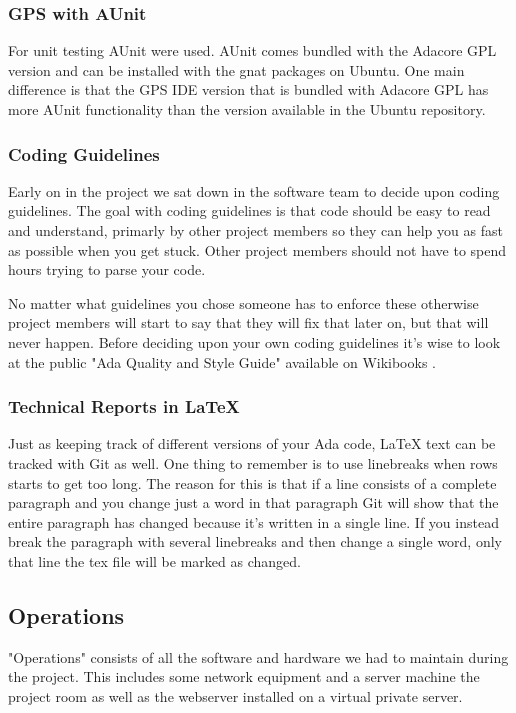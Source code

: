 \subsubsection{GPS with AUnit}
For unit testing AUnit were used. AUnit comes bundled with the Adacore GPL version
and can be installed with the gnat packages on Ubuntu. One main difference is that
the GPS IDE version that is bundled with Adacore GPL has more AUnit functionality
than the version available in the Ubuntu repository.

\subsubsection{Coding Guidelines}
Early on in the project we sat down in the software team to decide upon coding
guidelines. The goal with coding guidelines is that code should be easy to read
and understand, primarly by other project members so they can help you as fast as
possible when you get stuck. Other project members should not have to spend hours
trying to parse your code.

No matter what guidelines you chose someone has
to enforce these otherwise project members will start to say that they will fix
that later on, but that will
never happen. Before deciding upon your own coding guidelines it's wise to look
at the public "Ada Quality and Style Guide" available on Wikibooks \cite{web:wikibooks-ada-style-guide}.

\subsubsection{Technical Reports in LaTeX}
Just as keeping track of different versions of your Ada code, LaTeX text can be tracked
with Git as well. One thing to remember is to use linebreaks when rows starts to
get too long. The reason for this is that if a line consists of a complete paragraph
and you change just a word in that paragraph Git will show that the entire paragraph
has changed because it's written in a single line. If you instead break the paragraph
with several linebreaks and then change a single word, only that line the tex file
will be marked as changed.

\subsection{Operations}
"Operations" consists of all the software and hardware we had to maintain during the
project. This includes some network equipment and a server machine the project room
as well as the webserver installed on a virtual private server.

